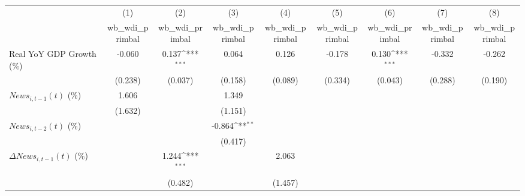 {
\def\sym#1{\ifmmode^{#1}\else\(^{#1}\)\fi}
\begin{tabular}{l*{8}{c}}
\toprule
                    &\multicolumn{1}{c}{(1)}&\multicolumn{1}{c}{(2)}&\multicolumn{1}{c}{(3)}&\multicolumn{1}{c}{(4)}&\multicolumn{1}{c}{(5)}&\multicolumn{1}{c}{(6)}&\multicolumn{1}{c}{(7)}&\multicolumn{1}{c}{(8)}\\
                    &\multicolumn{1}{c}{wb_wdi_primbal}&\multicolumn{1}{c}{wb_wdi_primbal}&\multicolumn{1}{c}{wb_wdi_primbal}&\multicolumn{1}{c}{wb_wdi_primbal}&\multicolumn{1}{c}{wb_wdi_primbal}&\multicolumn{1}{c}{wb_wdi_primbal}&\multicolumn{1}{c}{wb_wdi_primbal}&\multicolumn{1}{c}{wb_wdi_primbal}\\
\midrule
Real YoY GDP Growth (\%)&      -0.060         &       0.137\sym{***}&       0.064         &       0.126         &      -0.178         &       0.130\sym{***}&      -0.332         &      -0.262         \\
                    &     (0.238)         &     (0.037)         &     (0.158)         &     (0.089)         &     (0.334)         &     (0.043)         &     (0.288)         &     (0.190)         \\
\addlinespace
$ News_{i,t-1}(t)$ (\%)&       1.606         &                     &       1.349         &                     &                     &                     &                     &                     \\
                    &     (1.632)         &                     &     (1.151)         &                     &                     &                     &                     &                     \\
\addlinespace
$ News_{i,t-2}(t)$ (\%)&                     &                     &      -0.864\sym{**} &                     &                     &                     &                     &                     \\
                    &                     &                     &     (0.417)         &                     &                     &                     &                     &                     \\
\addlinespace
$ \Delta News_{i,t-1}(t)$ (\%)&                     &       1.244\sym{***}&                     &       2.063         &                     &                     &                     &                     \\
                    &                     &     (0.482)         &                     &     (1.457)         &                     &                     &                     &                     \\

\end{tabular}}
